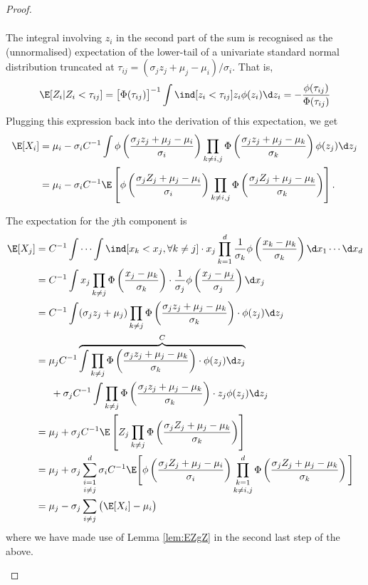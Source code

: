 \begin{proof}
\begin{enumerate}[label=(\roman*)]
\begin{align*}
  \end{align*}
  The integral involving $z_i$ in the second part of the sum is recognised as the (unnormalised) expectation of the lower-tail of a univariate standard normal distribution truncated at $\tau_{ij} = (\sigma_j z_j + \mu_j - \mu_i) / \sigma_i$. That is,
  \[
    \E[Z_i | Z_i < \tau_{ij}] 
    = \big[\Phi(\tau_{ij})\big]^{-1} \int \ind [z_i < \tau_{ij}] z_i \phi(z_i) \d z_i 
    = - \frac{\phi(\tau_{ij})}{\Phi(\tau_{ij})}
  \] Plugging this expression back into the derivation of this expectation, we get
  \begin{align*}
  \E[X_i] 
  &= \mu_i -  \sigma_i C^{-1} \int 
  \phi \left( \frac{\sigma_j z_j + \mu_j - \mu_i}{\sigma_i} \right)
  \prod_{k \neq i,j} \Phi \left( \frac{\sigma_j z_j + \mu_j - \mu_k}{\sigma_k} \right) \phi (z_j) \d z_j \\
  &= \mu_i - \sigma_i C^{-1} \E \left[ \phi \left( \frac{\sigma_j Z_j + \mu_j - \mu_i}{\sigma_i} \right)
  \prod_{k \neq i,j} \Phi \left( \frac{\sigma_j Z_j + \mu_j - \mu_k}{\sigma_k} \right) \right].
  \end{align*}
  
  The expectation for the $j$th component is
  \begin{align*}
    \E[X_j] 
    &= C^{-1} \idotsint \ind[x_k < x_j, \forall k \neq j] \cdot x_j  \prod_{k=1}^d \frac{1}{\sigma_k}\phi \left( \frac{x_k - \mu_k}{\sigma_k} \right) \d x_1 \cdots \d x_d \\
    &= C^{-1} \int x_j  \prod_{k \neq j} \Phi \left( \frac{x_j - \mu_k}{\sigma_k} \right) 
    \cdot \frac{1}{\sigma_j} \phi \left( \frac{x_j - \mu_j}{\sigma_j} \right) \d x_j  \\    
    &= C^{-1} \int (\sigma_j z_j + \mu_j)  \prod_{k \neq j} \Phi \left( \frac{\sigma_j z_j + \mu_j - \mu_k}{\sigma_k} \right) \cdot \phi (z_j) \d z_j  \\   
    &= \mu_j C^{-1} 
    \overbrace{
    \int  \prod_{k \neq j} \Phi \left( \frac{\sigma_j z_j + \mu_j - \mu_k}{\sigma_k} \right) \cdot \phi (z_j) \d z_j
    }^{C}  \\   
    &\phantom{==} + \sigma_j C^{-1} \int  \prod_{k \neq j} \Phi \left( \frac{\sigma_j z_j + \mu_j - \mu_k}{\sigma_k} \right) \cdot z_j \phi (z_j) \d z_j \\
    &= \mu_j + \sigma_j C^{-1} \E \left[ Z_j \prod_{k \neq j} \Phi \left( \frac{\sigma_j Z_j + \mu_j - \mu_k}{\sigma_k} \right) \right] \\
    &= \mu_j + \sigma_j  \mathop{\sum_{i=1}^d}_{i \neq j} \sigma_i C^{-1} \E \Bigg[ \phi \left( \frac{\sigma_j Z_j + \mu_j - \mu_i}{\sigma_i} \right) \mathop{\prod_{k=1}^d}_{k \neq i,j} \Phi \left( \frac{\sigma_j Z_j + \mu_j - \mu_k}{\sigma_k} \right) \Bigg] \\
    &= \mu_j - \sigma_j \sum_{i \neq j} \big(\E[X_i] - \mu_i \big)
  \end{align*}
  where we have made use of Lemma \ref{lem:EZgZ} in the second last step of the above.


\end{enumerate}
\end{proof}
